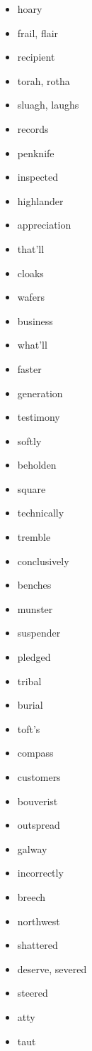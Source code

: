 \documentclass{article}
\begin{document}
\begin{itemize}
    \item hoary
    \item frail, flair
    \item recipient
    \item torah, rotha
    \item sluagh, laughs
    \item records
    \item penknife
    \item inspected
    \item highlander
    \item appreciation
    \item that'll
    \item cloaks
    \item wafers
    \item business
    \item what'll
    \item faster
    \item generation
    \item testimony
    \item softly
    \item beholden
    \item square
    \item technically
    \item tremble
    \item conclusively
    \item benches
    \item munster
    \item suspender
    \item pledged
    \item tribal
    \item burial
    \item toft's
    \item compass
    \item customers
    \item bouverist
    \item outspread
    \item galway
    \item incorrectly
    \item breech
    \item northwest
    \item shattered
    \item deserve, severed
    \item steered
    \item atty
    \item taut

\end{itemize}
\end{document}
